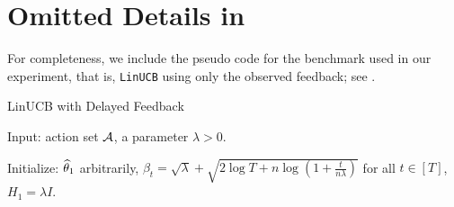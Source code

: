 \newpage
\section{Omitted Details in }\label{app: experiment}
For completeness, we include the pseudo code for the benchmark used in our experiment, that is, \texttt{LinUCB} using only the observed feedback;
see .

\begin{algorithm}[h]
\caption{LinUCB with Delayed Feedback}\label{alg:linUCB}
Input: action set ${\mathcal{A}}$, a parameter $\lambda>0$.

Initialize: $\widehat{\theta}_1$ arbitrarily, $\beta_t = \sqrt{\lambda} + \sqrt{2\log T+n\log(1+\frac{t}{n\lambda})}$ for all $t\in[T]$, $H_1 = \lambda I$.

\For{$t=1,2,\dots,T$}{
     Pick 
     \begin{align*}
         a_t=
         \begin{cases}
            \argmin_{a\in\calA} \inner{a,\wh{\theta}_t} - \beta \|a\|_{H_t}^{-1}, &\mbox{in the loss case,} \\
            \argmax_{a\in\calA} \inner{a,\wh{\theta}_t} + \beta \|a\|_{H_t}^{-1}, &\mbox{in the reward case.}
        \end{cases}
     \end{align*}
     
     Observe the payoff $u_\tau$ for all $\tau$ such that $\tau+d_{\tau}\in (t-1,t]$.

     Update $H_{t+1} = H_t + \sum_{\tau:\tau+d_{\tau}\in(t-1,t]}a_{\tau}a_{\tau}^\top$ and $\wh{\theta}_{t+1}=H_{t+1}^{-1}\sum_{\tau:\tau+d_{\tau}\leq t}a_{\tau}u_{\tau}$.
     
}
\end{algorithm}
